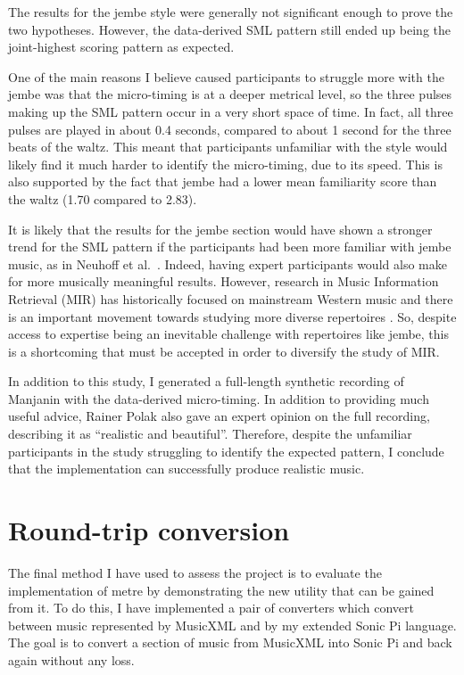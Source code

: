 \documentclass[12pt,twoside,openright]{report}
\begin{document}
The results for the jembe style were generally not significant enough to prove
the two hypotheses. However, the data-derived SML pattern still ended up being
the joint-highest scoring pattern as expected.

One of the main reasons I believe caused participants to struggle more with the
jembe was that the micro-timing is at a deeper metrical level, so the three
pulses making up the SML pattern occur in a very short space of time. In fact, all three pulses are
played in about 0.4 seconds, compared to about 1 second for the three beats of
the waltz. This meant that participants unfamiliar with the style would likely
find it much harder to identify the micro-timing, due to its speed. This is also
supported by the fact that jembe had a lower mean familiarity score than the
waltz (1.70 compared to 2.83).

It is likely that the results for the jembe section would have shown a stronger
trend for the SML pattern if the participants had been more familiar with jembe
music, as in Neuhoff et al.\ \cite{neuhoff2017}. Indeed, having expert participants would also make for more musically meaningful results. However, research in Music Information Retrieval (MIR) has historically focused on mainstream Western music \cite{gomez2013} and there is an important movement towards studying more diverse repertoires \cite{born2020}.
So, despite access to expertise being an inevitable challenge with repertoires like jembe, this is a shortcoming that must be accepted in order to diversify the study of MIR.

In addition to this study, I generated a full-length synthetic recording of
Manjanin with the data-derived micro-timing. In addition to providing much
useful advice, Rainer Polak also gave an expert opinion on the full recording,
describing it as ``realistic and beautiful''. Therefore, despite the unfamiliar
participants in the study struggling to identify the expected pattern, I conclude that the implementation can successfully produce realistic music.
\newpage



\section{Round-trip conversion} \label{metre_evaluation}

The final method I have used to assess the project is to evaluate the
implementation of metre by demonstrating the new utility that can be gained from
it. To do this, I have implemented a pair of converters which convert between
music represented by MusicXML and by my extended Sonic Pi language. The goal is
to convert a section of music from MusicXML into Sonic Pi and back again without
any loss.
\end{document}

